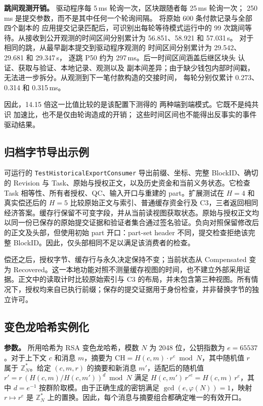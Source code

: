 \noindent\textbf{跳间观测开销。}
驱动程序每 5\,ms 轮询一次，区块跟随者每 25\,ms 轮询一次；
250\,ms 是提交参数，而不是其中任何一个轮询间隔。
将原始 600 条付款记录与全部四个副本的
应用提交记录匹配后，可识别出每轮等待模式运行中的
99 次跳间等待。从接收到公开观测的时间区间分别累计为
56.851、58.921 和 57.031\,s。
对于相同的跳，从最早副本提交到驱动程序观测的
时间区间分别累计为 29.542、29.681 和 29.347\,s，
逐跳 P50 约为 297\,ms。后一时间区间涵盖后继区块头
认证、获取与验证、本地记录、观测以及
副本间差异；由于缺少钱包内部时间戳，
无法进一步拆分。从观测到下一笔付款构造的交接时间，
每轮分别仅累计 0.273、0.314 和 0.315\,ms。

因此，14.15 倍这一比值比较的是该配置下测得的
两种端到端模式。它既不是纯共识
加速比，也不是仅由轮询造成的开销；
这些时间区间也不能得出反事实的事件驱动结果。

\subsection{归档字节导出示例}
可运行的 \texttt{TestHistoricalExportConsumer} 导出前缀、坐标、完整 BlockID、确切的 Revision 与 Task、原始与授权正文，以及历史资金和当前义务状态。它检查 Task 相等性、所有者授权、QC、输入开口与重建的 part。扩展测试在 $H=4$ 和真实偿还后的 $H=5$ 比较原始正文与索引、普通缓存资金行及 C3，三者返回相同经济答案。缓存行保留不可变字段，并从当前读视图获取状态。原始与授权正文均以同一份已保存的原始提交证据和验证者集合通过签名验证。负向对照保留修改后的正文及头部，但使用初始 part 开口：part-set header 不同，提交检查拒绝该完整 BlockID。因此，仅头部相同不足以满足该消费者的检查。

偿还之后，授权字节、缓存行与永久决定保持不变；当前状态从 Compensated 变为 Recovered。这一本地功能对照不测量缓存视图的时间，也不建立外部采用证据。正文中的读取计时比较原始索引与 C3 的布局，并未包含第三种视图。所有情况下，授权均来自已执行前缀；保存的提交证据用于身份检查，并非替换字节的独立许可。

\subsection{变色龙哈希实例化}
\label{sec:ch-params}

\noindent\textbf{参数。} 所用哈希为 RSA 变色龙哈希，模数 $N$ 为 2048 位，公钥指数为 $e=65537$。对于上下文 $c$ 和消息 $m$，摘要为 $\mathrm{CH}=H(c,m)\cdot r^{e}\bmod N$，其中随机值 $r$ 属于 $\mathbb{Z}_N^{*}$。给定 $(c,m,r)$ 的摘要和新消息 $m'$，适配后的随机值 $r'=r\,(H(c,m)/H(c,m'))^{d}\bmod N$ 满足 $H(c,m')\,r'^{e}=H(c,m)\,r^{e}$，其中 $d=e^{-1}$ 按群阶取模。由于正确生成的密钥满足 $\gcd(e,\varphi(N))=1$，映射 $r\mapsto r^e$ 是 $\mathbb{Z}_N^{*}$ 上的置换。因此，每个消息与摘要组合都确定唯一的有效开口。


